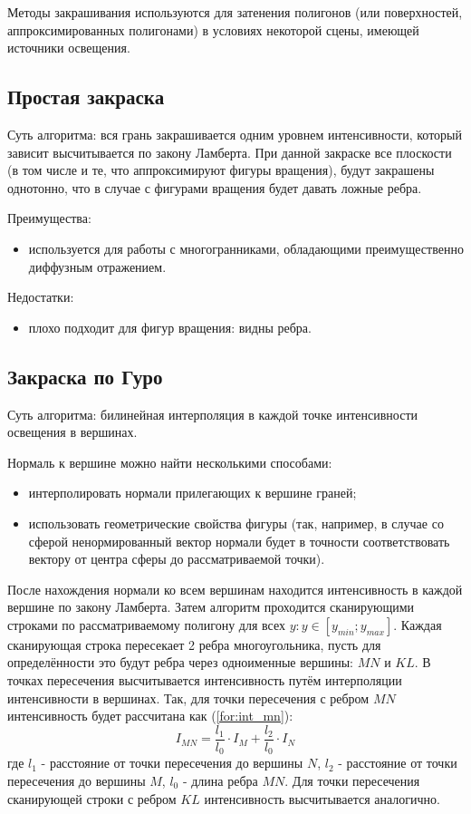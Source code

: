 Методы закрашивания используются для затенения полигонов
(или поверхностей, аппроксимированных полигонами)
в условиях некоторой сцены, имеющей источники освещения.

\subsection{Простая закраска}

Суть алгоритма: вся грань закрашивается одним уровнем интенсивности,
который зависит высчитывается по закону Ламберта\cite{rogers}.
При данной закраске все плоскости (в том числе и те,
что аппроксимируют фигуры вращения),
будут закрашены однотонно,
что в случае с фигурами вращения будет давать ложные ребра.

Преимущества:
\begin{itemize}
    \item используется для работы с многогранниками, обладающими преимущественно диффузным отражением.
\end{itemize}

Недостатки:

\begin{itemize}
    \item плохо подходит для фигур вращения: видны ребра.
\end{itemize}

\subsection{Закраска по Гуро}
Суть алгоритма: билинейная интерполяция в каждой точке интенсивности освещения в вершинах\cite{lmodels}.

Нормаль к вершине можно найти несколькими способами:
\begin{itemize}
    \item интерполировать нормали прилегающих к вершине граней;
    \item использовать геометрические свойства фигуры (так, например, в случае со сферой ненормированный вектор нормали будет в точности соответствовать вектору от центра сферы до рассматриваемой точки).
\end{itemize}

После нахождения нормали ко всем вершинам находится интенсивность в каждой вершине по закону Ламберта.
Затем алгоритм проходится сканирующими строками по рассматриваемому полигону для всех $y: y \in [y_{min}; y_{max}]$. Каждая сканирующая строка пересекает 2 ребра многоугольника, пусть для определённости это будут ребра через одноименные вершины: $MN$ и $KL$. В точках пересечения высчитывается интенсивность путём интерполяции интенсивности в вершинах.
Так, для точки пересечения с ребром $MN$ интенсивность будет рассчитана как (\ref{for:int_mn}):
\begin{equation}
    \label{for:int_mn}
    I_{MN} = \frac{l_1}{l_0} \cdot I_M + \frac{l_2}{l_0} \cdot I_N
\end{equation}
где $l_1$ - расстояние от точки пересечения до вершины $N$, $l_2$ - расстояние от точки пересечения до вершины $M$, $l_0$ - длина ребра $MN$.
Для точки пересечения сканирующей строки с ребром $KL$ интенсивность высчитывается аналогично.

